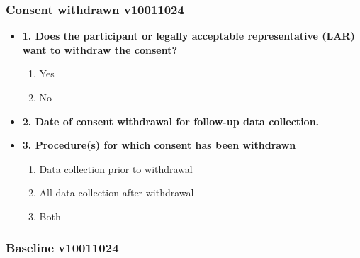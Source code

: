 \documentclass[
]{scrartcl}
\providecommand{\tightlist}{%
  \setlength{\itemsep}{0pt}\setlength{\parskip}{0pt}}\usepackage{longtable,booktabs,array}
\begin{document}
\hypertarget{consent-withdrawn-v10011024}{%
\subsubsection{Consent withdrawn
v10011024}\label{consent-withdrawn-v10011024}}

\begin{itemize}
\item
  \textbf{1. Does the participant or legally acceptable representative
  (LAR) want to withdraw the consent?}

  \begin{enumerate}
  \def\labelenumi{\arabic{enumi}.}
  \tightlist
  \item
    Yes
  \item
    No
  \end{enumerate}
\item
  \textbf{2. Date of consent withdrawal for follow-up data collection.}
\item
  \textbf{3. Procedure(s) for which consent has been withdrawn}

  \begin{enumerate}
  \def\labelenumi{\arabic{enumi}.}
  \tightlist
  \item
    Data collection prior to withdrawal
  \item
    All data collection after withdrawal
  \item
    Both
  \end{enumerate}
\end{itemize}

\hypertarget{baseline-v10011024}{%
\subsubsection{Baseline v10011024}\label{baseline-v10011024}}
\end{document}
